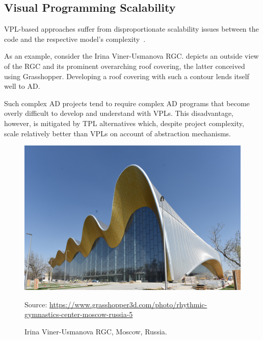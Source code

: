\subsection{Visual Programming Scalability}%
\label{sec:related.ad.vpl-scalability}

\Ac{VPL}-based approaches suffer from disproportionate scalability issues
between the code and the respective model's
complexity~\cite{Leitao:2013:PESLGD}.

As an example, consider the Irina Viner-Usmanova \ac{RGC}.
 depicts an outside view of the
\ac{RGC} and its prominent overarching roof covering, the latter conceived using
Grasshopper.  Developing a roof covering with such a contour lends itself well
to \ac{AD}.

Such complex \ac{AD} projects tend to require complex \ac{AD} programs that
become overly difficult to develop and understand with \acp{VPL}.  This
disadvantage, however, is mitigated by \ac{TPL} alternatives which, despite
project complexity, scale relatively better than \acp{VPL} on account of
abstraction mechanisms.

\begin{figure}[htbp]
  \includegraphics[width=\linewidth]{fig/rgc}
  \begin{minipage}{\linewidth}
  \scriptsize Source:
  \url{https://www.grasshopper3d.com/photo/rhythmic-gymnastics-center-moscow-russia-5}
  \end{minipage}
  \caption{\label{fig:related.ad.vpl-scalability.rgc}
    Irina Viner-Usmanova \ac{RGC}, Moscow, Russia.}%
\end{figure}
